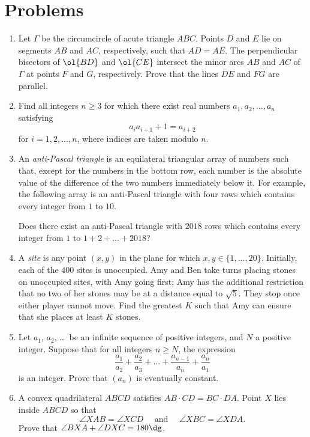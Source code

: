 \documentclass[11pt]{scrartcl}
\begin{document}
\section{Problems}
\begin{enumerate}[\bfseries 1.]
\item %
Let $\Gamma$ be the circumcircle of acute triangle $ABC$.
Points $D$ and $E$ lie on segments $AB$ and $AC$,
respectively, such that $AD = AE$.
The perpendicular bisectors of $\ol{BD}$ and $\ol{CE}$
intersect the minor arcs $AB$ and $AC$ of $\Gamma$
at points $F$ and $G$, respectively.
Prove that the lines $DE$ and $FG$ are parallel.

\item %
Find all integers $n \geq 3$ for which
there exist real numbers $a_1, a_2, \dots, a_n$ satisfying
\[ a_i a_{i+1} +1 = a_{i+2} \]
for $i=1,2, \dots, n$, where indices are taken modulo $n$.

\item %
An \emph{anti-Pascal triangle} is an equilateral triangular array
of numbers such that, except for the numbers in the bottom row,
each number is the absolute value of the difference
of the two numbers immediately below it.
For example, the following array is an anti-Pascal triangle
with four rows which contains every integer from $1$ to $10$.
\begin{center}
\end{center}
Does there exist an anti-Pascal triangle with $2018$ rows
which contains every integer from $1$ to $1+2+\dots +2018$?

\item %
A \emph{site} is any point $(x,y)$ in the plane
for which $x,y \in \{1, \dots, 20\}$.
Initially, each of the $400$ sites is unoccupied.
Amy and Ben take turns placing stones on unoccupied sites,
with Amy going first;
Amy has the additional restriction that no two of her stones
may be at a distance equal to $\sqrt5$.
They stop once either player cannot move.
Find the greatest $K$ such that Amy can ensure that
she places at least $K$ stones.

\item %
Let $a_1$, $a_2$, \dots\ be an infinite sequence of positive integers,
and $N$ a positive integer.
Suppose that for all integers $n \ge N$, the expression
\[ \frac{a_1}{a_2} + \frac{a_2}{a_3} + \dots
  + \frac{a_{n-1}}{a_n} + \frac{a_n}{a_1} \]
is an integer.
Prove that $(a_n)$ is eventually constant.

\item %
A convex quadrilateral $ABCD$ satisfies $AB \cdot CD = BC \cdot DA$.
Point $X$ lies inside $ABCD$ so that
\[ \angle XAB=\angle XCD \quad \text{ and } \quad \angle XBC=\angle XDA. \]
Prove that $\angle BXA + \angle DXC=180\dg$.

\end{enumerate}
\end{document}
